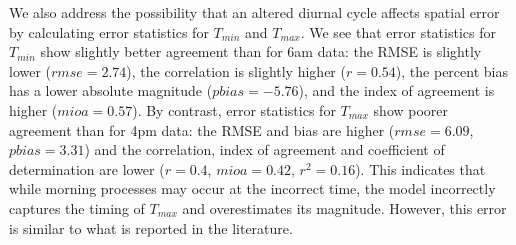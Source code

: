 We also address the possibility that an altered diurnal cycle affects spatial error by calculating error statistics for $T_{min}$ and $T_{max}$. We see that error statistics for $T_{min}$ show slightly better agreement than for 6am data: the RMSE is slightly lower ($rmse = 2.74$), the correlation is slightly higher ($r=0.54$), the percent bias has a lower absolute magnitude ($pbias=-5.76$), and the index of agreement is higher ($mioa=0.57$). By contrast, error statistics for $T_{max}$ show poorer agreement than for 4pm data: 
the RMSE and bias are higher ($rmse=6.09$, $pbias=3.31$) and the correlation, index of agreement and coefficient of determination are lower ($r=0.4$, $mioa=0.42$, $r^2=0.16$). 
This indicates that while morning processes may occur at the incorrect time, the model incorrectly captures the timing of $T_{max}$ and overestimates its magnitude. However, this error is similar to what is reported in the literature. 

%

